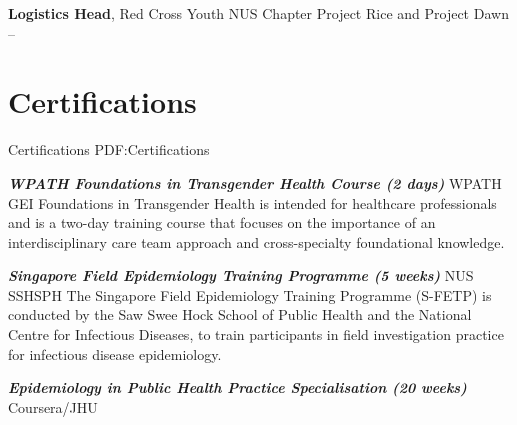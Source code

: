 \documentclass[letterpaper,10pt,oneside]{article}
\begin{document}
\begin{body}
\textbf{Logistics Head}, Red Cross Youth NUS Chapter Project Rice and Project Dawn
\hfill
{} --  
\GapNoBreak





\section
{Certifications}
{Certifications}
{PDF:Certifications}

\textbf{\textit{WPATH Foundations in Transgender Health Course (2 days) }} WPATH GEI
\hfill
{}
\BulletItem
Foundations in Transgender Health is intended for healthcare professionals and is a two-day training course that focuses on the importance of an interdisciplinary care team approach and cross-specialty foundational knowledge.

\textbf{\textit{Singapore Field Epidemiology Training Programme (5 weeks)}} NUS SSHSPH 
\hfill
{}
\BulletItem
The Singapore Field Epidemiology Training Programme (S-FETP) is conducted by the Saw Swee Hock School of Public Health and the National Centre for Infectious Diseases, to train participants in field investigation practice for infectious disease epidemiology.

\textbf{\textit{Epidemiology in Public Health Practice Specialisation (20 weeks)}} Coursera/JHU 
\hfill
{}


\end{body}
\end{document}
